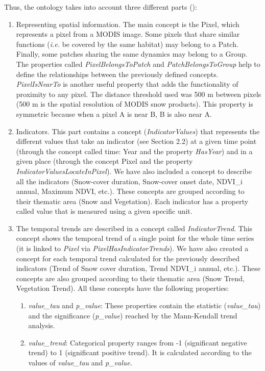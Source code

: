 Thus, the ontology takes into account three different parts ():

\begin{enumerate}
    \item Representing spatial information. The main concept is the Pixel, which represents a pixel from a MODIS image. Some pixels that share similar functions (\emph{i.e.} be covered by the same habitat) may belong to a Patch. Finally, some patches sharing the same dynamics may belong to a Group. The properties called \emph{PixelBelongsToPatch} and \emph{PatchBelongsToGroup} help to define the relationships between the previously defined concepts. \emph{PixelIsNearTo} is another useful property that adds the functionality of proximity to any pixel. The distance threshold used was 500 m between pixels (500 m is the spatial resolution of MODIS snow products). This property is symmetric because when a pixel A is near B, B is also near A.
    \item Indicators. This part contains a concept (\emph{IndicatorValues}) that represents the different values that take an indicator (see Section 2.2) at a given time point (through the concept called time: Year and the property \emph{HasYear}) and in a given place (through the concept Pixel and the property \emph{IndicatorValuesLocateInPixel}). We have also included a concept to describe all the indicators (Snow-cover duration, Snow-cover onset date, NDVI\_i annual, Maximum NDVI, etc.). These concepts are grouped according to their thematic area (Snow and Vegetation). Each indicator has a property called value that is measured using a given specific unit.
    \item The temporal trends are described in a concept called \emph{IndicatorTrend}. This concept shows the temporal trend of a single point for the whole time series (it is linked to \emph{Pixel} via \emph{PixelHasIndicatorTrends}). We have also created a concept for each temporal trend calculated for the previously described indicators (Trend of Snow cover duration, Trend NDVI\_i annual, etc.). These concepts are also grouped according to their thematic area (Snow Trend, Vegetation Trend). All these concepts have the following properties:
    \begin{enumerate}
        \item \emph{value\_tau} and \emph{p\_value}: These properties contain the statistic (\emph{value\_tau}) and the significance (\emph{p\_value}) reached by the Mann-Kendall trend analysis.
        \item \emph{value\_trend}: Categorical property ranges from -1 (significant negative trend) to 1 (significant positive trend). It is calculated according to the values of \emph{value\_tau} and \emph{p\_value.}
    \end{enumerate}
\end{enumerate}

